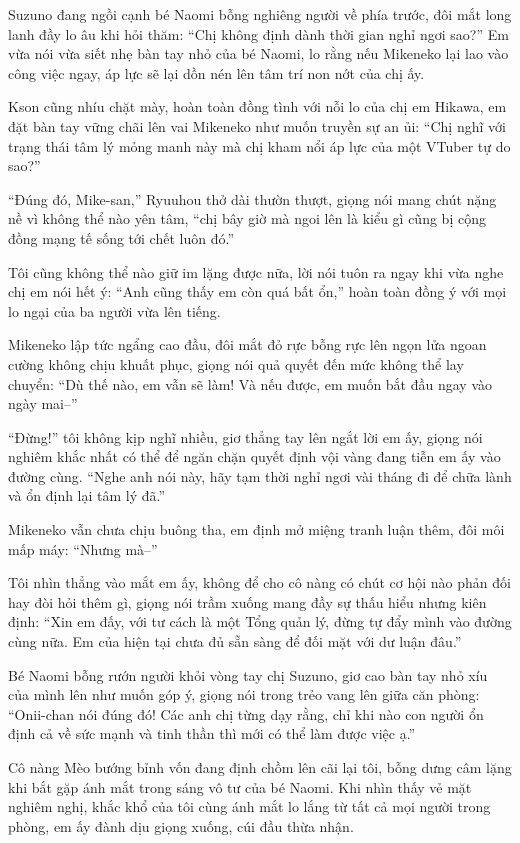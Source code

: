 ﻿\documentclass[../main.tex]{subfiles}
\begin{document}
Suzuno đang ngồi cạnh bé Naomi bỗng nghiêng người về phía trước, đôi mắt long lanh đầy lo âu khi hỏi thăm: ``Chị không định dành thời gian nghỉ ngơi sao?'' Em vừa nói vừa siết nhẹ bàn tay nhỏ của bé Naomi, lo rằng nếu Mikeneko lại lao vào công việc ngay, áp lực sẽ lại dồn nén lên tâm trí non nớt của chị ấy.

Kson cũng nhíu chặt mày, hoàn toàn đồng tình với nỗi lo của chị em Hikawa, em đặt bàn tay vững chãi lên vai Mikeneko như muốn truyền sự an ủi: ``Chị nghĩ với trạng thái tâm lý mỏng manh này mà chị kham nổi áp lực của một VTuber tự do sao?''

``Đúng đó, Mike-san,'' Ryuuhou thở dài thườn thượt, giọng nói mang chút nặng nề vì không thể nào yên tâm, ``chị bây giờ mà ngoi lên là kiểu gì cũng bị cộng đồng mạng tế sống tới chết luôn đó.''

Tôi cũng không thể nào giữ im lặng được nữa, lời nói tuôn ra ngay khi vừa nghe chị em nói hết ý: ``Anh cũng thấy em còn quá bất ổn,'' hoàn toàn đồng ý với mọi lo ngại của ba người vừa lên tiếng.

Mikeneko lập tức ngẩng cao đầu, đôi mắt đỏ rực bỗng rực lên ngọn lửa ngoan cường không chịu khuất phục, giọng nói quả quyết đến mức không thể lay chuyển: ``Dù thế nào, em vẫn sẽ làm! Và nếu được, em muốn bắt đầu ngay vào ngày mai--''

``Đừng!'' tôi không kịp nghĩ nhiều, giơ thẳng tay lên ngắt lời em ấy, giọng nói nghiêm khắc nhất có thể để ngăn chặn quyết định vội vàng đang tiễn em ấy vào đường cùng. ``Nghe anh nói này, hãy tạm thời nghỉ ngơi vài tháng đi để chữa lành và ổn định lại tâm lý đã.''

Mikeneko vẫn chưa chịu buông tha, em định mở miệng tranh luận thêm, đôi môi mấp máy: ``Nhưng mà--''

Tôi nhìn thẳng vào mắt em ấy, không để cho cô nàng có chút cơ hội nào phản đối hay đòi hỏi thêm gì, giọng nói trầm xuống mang đầy sự thấu hiểu nhưng kiên định: ``Xin em đấy, với tư cách là một Tổng quản lý, đừng tự đẩy mình vào đường cùng nữa. Em của hiện tại chưa đủ sẵn sàng để đối mặt với dư luận đâu.''

Bé Naomi bỗng rướn người khỏi vòng tay chị Suzuno, giơ cao bàn tay nhỏ xíu của mình lên như muốn góp ý, giọng nói trong trẻo vang lên giữa căn phòng: ``Onii-chan nói đúng đó! Các anh chị từng dạy rằng, chỉ khi nào con người ổn định cả về sức mạnh và tinh thần thì mới có thể làm được việc ạ.''

Cô nàng Mèo bướng bỉnh vốn đang định chồm lên cãi lại tôi, bỗng dưng câm lặng khi bắt gặp ánh mắt trong sáng vô tư của bé Naomi. Khi nhìn thấy vẻ mặt nghiêm nghị, khắc khổ của tôi cùng ánh mắt lo lắng từ tất cả mọi người trong phòng, em ấy đành dịu giọng xuống, cúi đầu thừa nhận.
\end{document}
